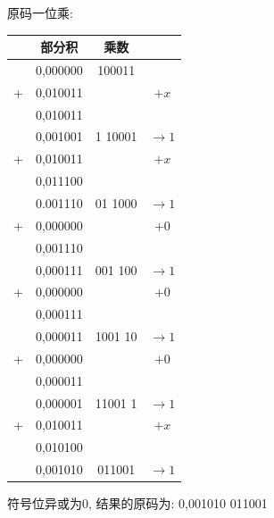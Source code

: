 \documentclass[UTF8]{report}
\newcommand{\ra}{\rightarrow}
\newenvironment{solution}{{\noindent\hskip 2em \bf 解 \quad}}{}
\begin{document}
\begin{solution}
\begin{enumerate}
        原码一位乘:
        \begin{tabular}{cc|c|c}
             & 部分积     & 乘数     & \\
            \hline
             & 0,000000 & 100011  &         \\
            +& 0,010011 &         & $+x$    \\
            \hline
             & 0,010011 &         &         \\
             & 0,001001 & 1 10001 & $\ra 1$ \\
            +& 0,010011 &         & $+x$    \\
            \hline
             & 0,011100 &         &         \\
             & 0.001110 & 01 1000 & $\ra 1$ \\
            +& 0,000000 &         & $+0$    \\
            \hline
             & 0,001110 &         &         \\
             & 0,000111 & 001 100 & $\ra 1$ \\
            +& 0,000000 &         & $+0$    \\
            \hline
             & 0,000111 &         &         \\
             & 0,000011 & 1001 10 & $\ra 1$ \\
            +& 0,000000 &         & $+0$    \\
            \hline
             & 0,000011 &         &         \\
             & 0,000001 & 11001 1 & $\ra 1$ \\
            +& 0,010011 &         & $+x$    \\
            \hline
             & 0,010100 &         &         \\
             & 0,001010 & 011001 & $\ra 1$ \\
        \end{tabular}
        
        符号位异或为0, 结果的原码为: 0,001010 011001
        

\end{enumerate}
\end{solution}
\end{document}
